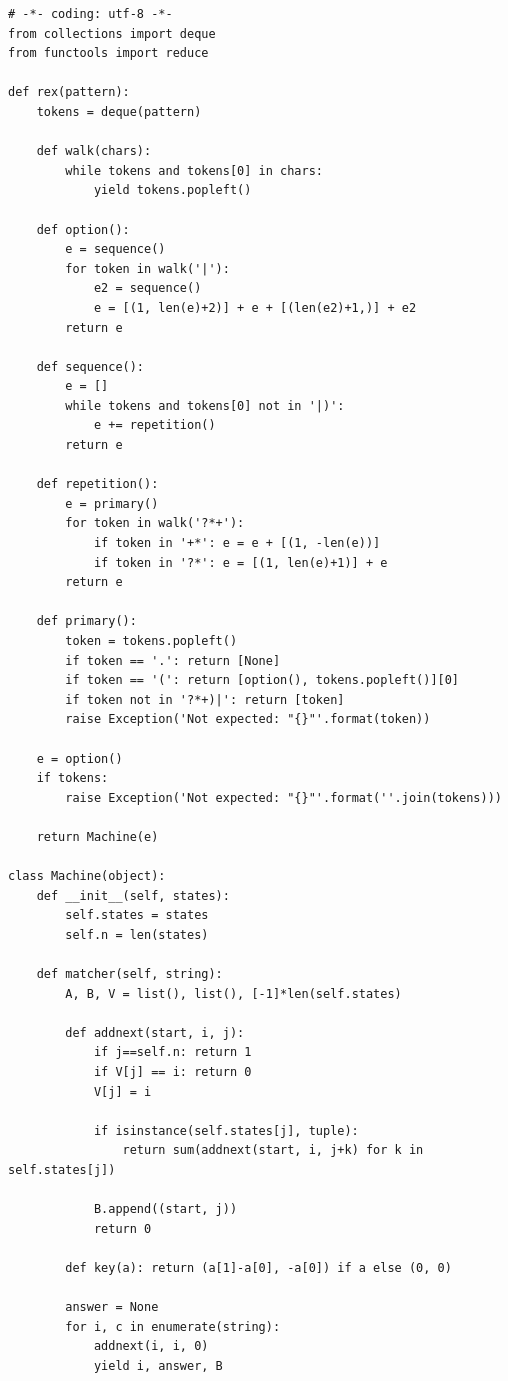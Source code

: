 \documentclass[a4paper,12pt,oneside,onecolumn]{uerj}
\begin{document}
\begin{lstlisting}[caption={Código-fonte da biblioteca PyRex},label=lst:fill_appendice]
# -*- coding: utf-8 -*-
from collections import deque
from functools import reduce

def rex(pattern):
    tokens = deque(pattern)

    def walk(chars):
        while tokens and tokens[0] in chars:
            yield tokens.popleft()

    def option():
        e = sequence()
        for token in walk('|'):
            e2 = sequence()
            e = [(1, len(e)+2)] + e + [(len(e2)+1,)] + e2
        return e        

    def sequence():
        e = []
        while tokens and tokens[0] not in '|)':
            e += repetition()
        return e
        
    def repetition():
        e = primary()
        for token in walk('?*+'):
            if token in '+*': e = e + [(1, -len(e))]
            if token in '?*': e = [(1, len(e)+1)] + e
        return e
        
    def primary():
        token = tokens.popleft()
        if token == '.': return [None]
        if token == '(': return [option(), tokens.popleft()][0]
        if token not in '?*+)|': return [token]
        raise Exception('Not expected: "{}"'.format(token))

    e = option()
    if tokens: 
        raise Exception('Not expected: "{}"'.format(''.join(tokens)))

    return Machine(e)
                
class Machine(object):
    def __init__(self, states):
        self.states = states
        self.n = len(states)
        
    def matcher(self, string):
        A, B, V = list(), list(), [-1]*len(self.states)
            
        def addnext(start, i, j):
            if j==self.n: return 1
            if V[j] == i: return 0
            V[j] = i

            if isinstance(self.states[j], tuple):
                return sum(addnext(start, i, j+k) for k in self.states[j])

            B.append((start, j))
            return 0
        
        def key(a): return (a[1]-a[0], -a[0]) if a else (0, 0)

        answer = None
        for i, c in enumerate(string):
            addnext(i, i, 0)
            yield i, answer, B
            

\end{lstlisting}
\end{document}

